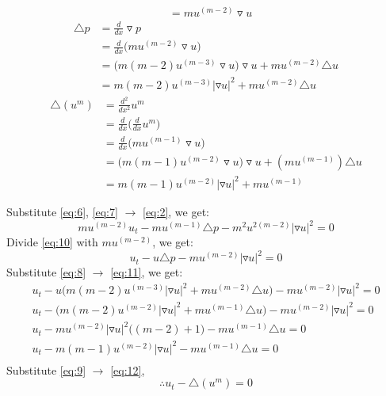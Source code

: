 \documentclass[a4paper,9pt]{article}
\begin{document}
\begin{enumerate}
\begin{multicols}{2}
\begin{equation}
\begin{aligned}
		&= m u^{(m-2)} \triangledown u
		\end{aligned}
		\end{equation}
		\columnbreak
		\begin{equation}\label{eq:8}
		\begin{aligned}
		\triangle p &= \frac{d}{dx} \triangledown p\\
		&= \frac{d}{dx} \big(mu^{(m-2)} \triangledown u\big)\\
		&=\big(m(m-2)u^{(m-3)}\triangledown u\big)\triangledown u + mu^{(m-2)} \triangle u\\
		&= m(m-2)u^{(m-3)} |\triangledown u|^2 + mu^{(m-2)} \triangle u
		\end{aligned}
		\end{equation}
		\newline
		\begin{equation}\label{eq:9}
		\begin{aligned}
		\triangle (u^m) &= \frac{d^2}{dx^2} u^m\\
		&= \frac{d}{dx} \bigg(\frac{d}{dx}u^m\bigg)\\
		&= \frac{d}{dx} \bigg(mu^{(m-1)}\triangledown u\bigg)\\
		&= \big(m(m-1)u^{(m-2)}\triangledown u\big)\triangledown u + (mu^{(m-1)}) \triangle u\\
		&= m(m-1)u^{(m-2)}|\triangledown u|^2 + mu^{(m-1)}
		\end{aligned}
		\end{equation}
	\end{multicols}
	Substitute \eqref{eq:6}, \eqref{eq:7} $\rightarrow$ \eqref{eq:2}, we get:
	\begin{equation}\label{eq:10}
	m u^{(m-2)} u_t - mu^{(m-1)} \triangle p - m^2u^{2(m-2)} |\triangledown u|^2 = 0
	\end{equation}
	Divide \eqref{eq:10} with $mu^{(m-2)}$, we get:
	\begin{equation}\label{eq:11}
	u_t - u \triangle p - m u^{(m-2)} |\triangledown u|^2 = 0
	\end{equation}
	Substitute \eqref{eq:8} $\rightarrow$ \eqref{eq:11}, we get:
	\begin{equation}\label{eq:12}
	\begin{aligned}
	u_t - u \bigg( m(m-2)u^{(m-3)} |\triangledown u|^2 + mu^{(m-2)} \triangle u \bigg) - m u^{(m-2)} |\triangledown u|^2 = 0\\
	u_t - \bigg( m(m-2)u^{(m-2)} |\triangledown u|^2 + mu^{(m-1)} \triangle u \bigg) - m u^{(m-2)} |\triangledown u|^2 = 0\\
	u_t - m u^{(m-2)} |\triangledown u|^2\bigg( (m-2) + 1 \bigg) - mu^{(m-1)} \triangle u = 0\\
	u_t - m(m-1) u^{(m-2)} |\triangledown u|^2 - mu^{(m-1)} \triangle u = 0\\
	\end{aligned}
	\end{equation}
	Substitute \eqref{eq:9} $\rightarrow$ \eqref{eq:12},
	\begin{equation}
	\therefore u_t - \triangle (u^m) = 0
	\end{equation}
\end{enumerate}
\end{document}
